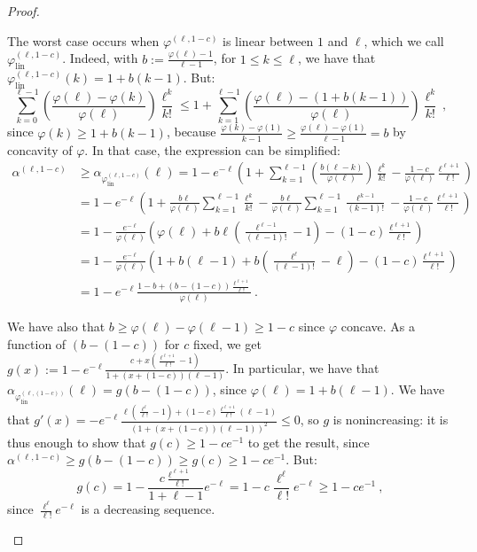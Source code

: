 \begin{proof}
\begin{enumerate}
The worst case occurs when $\varphi^{(\ell,1-c)}$ is linear between $1$ and $\ell$, which we call $\varphi_{\text{lin}}^{(\ell,1-c)}$. Indeed, with $b:=\frac{\varphi(\ell)-1}{\ell-1}$, for $1 \leq k \leq \ell$, we have that $\varphi_{\text{lin}}^{(\ell,1-c)}(k) = 1 + b(k-1)$. But:
\[\sum_{k=0}^{\ell-1}\left(\frac{\varphi(\ell)-\varphi(k)}{\varphi(\ell)}\right)\frac{\ell^k}{k!} \leq 1 + \sum_{k=1}^{\ell-1}\left(\frac{\varphi(\ell)- \left(1+b(k-1)\right)}{\varphi(\ell)}\right)\frac{\ell^k}{k!} \ ,\]
since $\varphi(k) \geq 1 + b(k-1)$, because $\frac{\varphi(k)-\varphi(1)}{k-1} \geq \frac{\varphi(\ell)-\varphi(1)}{\ell-1} = b$ by concavity of $\varphi$. In that case, the expression can be simplified:
\begin{equation}
  \begin{aligned}
  \alpha^{(\ell,1-c)} &\geq \alpha_{\varphi_{\text{lin}}^{(\ell,1-c)}}(\ell) =  1-e^{-\ell}\left(1+ \sum_{k=1}^{\ell-1}\left(\frac{b(\ell-k)}{\varphi(\ell)}\right)\frac{\ell^k}{k!} -\frac{1-c}{\varphi(\ell)}\frac{\ell^{\ell+1}}{\ell!}\right)\\
  &= 1-e^{-\ell}\left(1 + \frac{b\ell}{\varphi(\ell)}\sum_{k=1}^{\ell-1}\frac{\ell^k}{k!} - \frac{b\ell}{\varphi(\ell)}\sum_{k=1}^{\ell-1}\frac{\ell^{k-1}}{(k-1)!} -\frac{1-c}{\varphi(\ell)}\frac{\ell^{\ell+1}}{\ell!}\right)\\
  &= 1-\frac{e^{-\ell}}{\varphi(\ell)}\left(\varphi(\ell) + b\ell\left(\frac{\ell^{\ell-1}}{(\ell-1)!} - 1\right) -(1-c)\frac{\ell^{\ell+1}}{\ell!}\right)\\
     &= 1-\frac{e^{-\ell}}{\varphi(\ell)}\left(1 + b(\ell-1) + b\left(\frac{\ell^{\ell}}{(\ell-1)!} - \ell\right) -(1-c)\frac{\ell^{\ell+1}}{\ell!}\right)\\
  &= 1 - e^{-\ell}\frac{1-b + (b-(1-c))\frac{\ell^{\ell+1}}{\ell!}}{\varphi(\ell)} \ .
  \end{aligned}
\end{equation}

We have also that $b \geq \varphi(\ell)-\varphi(\ell-1) \geq 1-c$ since $\varphi$ concave. As a function of $(b-(1-c))$ for $c$ fixed, we get $g(x) := 1 - e^{-\ell}\frac{c + x\left(\frac{\ell^{\ell+1}}{\ell!}-1\right)}{1 + (x+(1-c))(\ell-1)}$. In particular, we have that $\alpha_{\varphi_{\text{lin}}^{(\ell,(1-c))}}(\ell) = g(b-(1-c))$, since $\varphi(\ell) = 1 + b(\ell-1)$. We have that $g'(x) = -e^{-\ell}\frac{\ell\left(\frac{\ell^{\ell}}{\ell!}-1\right)+(1-c)\frac{\ell^{\ell+1}}{\ell!}(\ell-1)}{(1 + (x+(1-c))(\ell-1))^2} \leq 0$, so $g$ is nonincreasing: it is thus enough to show that $g(c) \geq 1-ce^{-1}$ to get the result, since $\alpha^{(\ell,1-c)} \geq g(b-(1-c)) \geq g(c) \geq  1-ce^{-1}$. But:
\[ g(c) = 1 - \frac{c\frac{\ell^{\ell+1}}{\ell!}}{1 + \ell-1}e^{-\ell} = 1 - c\frac{\ell^{\ell}}{\ell!}e^{-\ell} \geq 1-ce^{-1} \ , \]
since $\frac{\ell^\ell}{\ell!}e^{-\ell}$ is a decreasing sequence.
\end{enumerate}
\end{proof}


